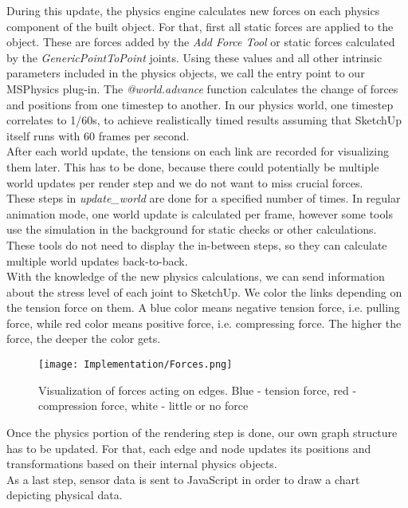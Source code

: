 During this update, the physics engine calculates new forces on each physics component of the built object. For that, first all static forces are applied to the object. These are forces added by the \textit{Add Force Tool} or static forces calculated by the \textit{GenericPointToPoint} joints. Using these values and all other intrinsic parameters included in the physics objects, we call the entry point to our MSPhysics plug-in. The \textit{@world.advance} function calculates the change of forces and positions from one timestep to another. In our physics world, one timestep correlates to 1/60s, to achieve realistically timed results assuming that SketchUp itself runs with 60 frames per second.\\
After each world update, the tensions on each link are recorded for visualizing them later. This has to be done, because there could potentially be multiple world updates per render step and we do not want to miss crucial forces.\\
These steps in \textit{update\_world} are done for a specified number of times. In regular animation mode, one world update is calculated per frame, however some tools use the simulation in the background for static checks or other calculations. These tools do not need to display the in-between steps, so they can calculate multiple world updates back-to-back.\\
With the knowledge of the new physics calculations, we can send information about the stress level of each joint to SketchUp. We color the links depending on the tension force on them. A blue color means negative tension force, i.e. pulling force, while red color means positive force, i.e. compressing force. The higher the force, the deeper the color gets.\\
\begin{figure}[h!]
    \texttt{[image: Implementation/Forces.png]}
    \centering
    \caption{Visualization of forces acting on edges. Blue - tension force, red - compression force, white - little or no force}
    \label{fig:force_visualization}
\end{figure}
Once the physics portion of the rendering step is done, our own graph structure has to be updated. For that, each edge and node updates its positions and transformations based on their internal physics objects.\\
As a last step, sensor data is sent to JavaScript in order to draw a chart depicting physical data.


